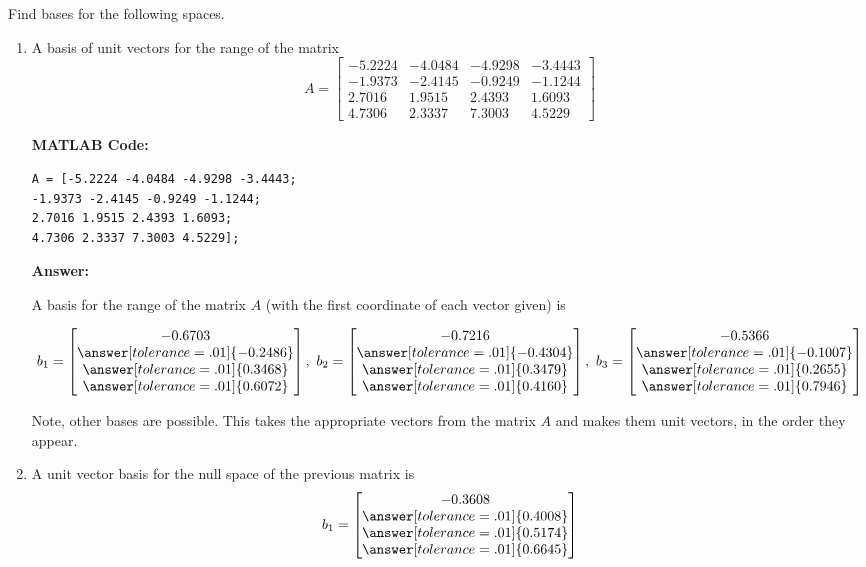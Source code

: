 \documentclass{ximera}
\begin{document}
\begin{example}
Find bases for the following spaces.

\begin{enumerate}
    \item A basis of unit vectors for the range of the matrix \[
A = \begin{bmatrix} 
-5.2224 & -4.0484 & -4.9298 & -3.4443 \\ 
-1.9373 & -2.4145 & -0.9249 & -1.1244 \\ 
2.7016 & 1.9515 & 2.4393 & 1.6093 \\ 
4.7306 & 2.3337 & 7.3003 & 4.5229 
\end{bmatrix}
\]

\textbf{MATLAB Code:}

\begin{verbatim}
A = [-5.2224 -4.0484 -4.9298 -3.4443; 
-1.9373 -2.4145 -0.9249 -1.1244; 
2.7016 1.9515 2.4393 1.6093; 
4.7306 2.3337 7.3003 4.5229];
\end{verbatim}

    \textbf{Answer:}

    A basis for the range of the matrix $A$ (with the first coordinate of each vector given) is 

    \[
b_1 = \begin{bmatrix} -0.6703 \\ \answer[tolerance=.01]{-0.2486} \\ \answer[tolerance=.01]{0.3468} \\ \answer[tolerance=.01]{0.6072} \end{bmatrix}, \quad
b_2 = \begin{bmatrix} -0.7216 \\ \answer[tolerance=.01]{-0.4304} \\ \answer[tolerance=.01]{0.3479} \\ \answer[tolerance=.01]{0.4160} \end{bmatrix}, \quad
b_3 = \begin{bmatrix} -0.5366 \\ \answer[tolerance=.01]{-0.1007} \\ \answer[tolerance=.01]{0.2655} \\ \answer[tolerance=.01]{0.7946} \end{bmatrix}
\]

    Note, other bases are possible. This takes the appropriate vectors from the matrix $A$ and makes them unit vectors, in the order they appear.

    \item A unit vector basis for the null space of the previous matrix is \[
b_1 = \begin{bmatrix} -0.3608 \\ \answer[tolerance=.01]{0.4008} \\ \answer[tolerance=.01]{0.5174} \\ \answer[tolerance=.01]{0.6645} \end{bmatrix}
\]



\end{enumerate}
\end{example}
\end{document}
